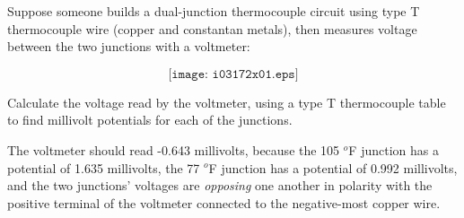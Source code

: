 

Suppose someone builds a dual-junction thermocouple circuit using type T thermocouple wire (copper and constantan metals), then measures voltage between the two junctions with a voltmeter:

$$\texttt{[image: i03172x01.eps]}$$

Calculate the voltage read by the voltmeter, using a type T thermocouple table to find millivolt potentials for each of the junctions.







The voltmeter should read -0.643 millivolts, because the 105 $^{o}$F junction has a potential of 1.635 millivolts, the 77 $^{o}$F junction has a potential of 0.992 millivolts, and the two junctions' voltages are {\it opposing} one another in polarity with the positive terminal of the voltmeter connected to the negative-most copper wire.











